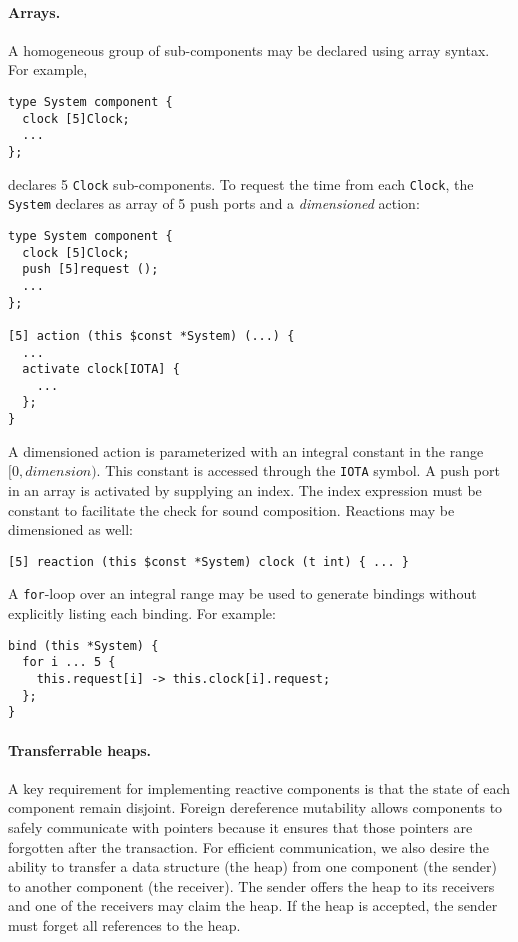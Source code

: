 \paragraph{Arrays.}
A homogeneous group of sub-components may be declared using array syntax.
For example,
\begin{verbatim}
type System component {
  clock [5]Clock;
  ...
};
\end{verbatim}
declares 5 \verb+Clock+ sub-components.
To request the time from each \verb+Clock+, the \verb+System+ declares as array of 5 push ports and a \emph{dimensioned} action:
\begin{verbatim}
type System component {
  clock [5]Clock;
  push [5]request ();
  ...
};

[5] action (this $const *System) (...) {
  ...
  activate clock[IOTA] {
    ...
  };
}
\end{verbatim}
A dimensioned action is parameterized with an integral constant in the range $[0,dimension)$.
This constant is accessed through the \verb+IOTA+ symbol.
A push port in an array is activated by supplying an index.
The index expression must be constant to facilitate the check for sound composition.
Reactions may be dimensioned as well:
\begin{verbatim}
[5] reaction (this $const *System) clock (t int) { ... }
\end{verbatim}
A \verb+for+-loop over an integral range may be used to generate bindings without explicitly listing each binding.
For example:
\begin{verbatim}
bind (this *System) {
  for i ... 5 {
    this.request[i] -> this.clock[i].request;
  };
}
\end{verbatim}

\paragraph{Transferrable heaps.}
A key requirement for implementing reactive components is that the state of each component remain disjoint.
Foreign dereference mutability allows components to safely communicate with pointers because it ensures that those pointers are forgotten after the transaction.
For efficient communication, we also desire the ability to transfer a data structure (the heap) from one component (the sender) to another component (the receiver).
The sender offers the heap to its receivers and one of the receivers may claim the heap.
If the heap is accepted, the sender must forget all references to the heap.

